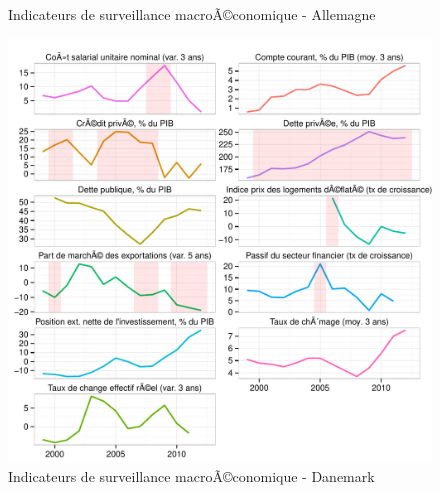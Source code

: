 \documentclass{article}\usepackage[]{graphicx}\usepackage[]{color}
\makeatletter
\def\maxwidth{ %
  \ifdim\Gin@nat@width>\linewidth
    \linewidth
  \else
    \Gin@nat@width
  \fi
}
\newenvironment{knitrout}{}{} %
\makeatother
\begin{document}
\begin{knitrout}
\begin{figure}[p]
{}

\caption[Indicateurs de surveillance macroÃ©conomique - Allemagne]{Indicateurs de surveillance macroÃ©conomique - Allemagne\label{fig:byco6}}
\end{figure}

\begin{figure}[p]


{\centering \includegraphics[width=\maxwidth]{figure_graph/byco7} 

}

\caption[Indicateurs de surveillance macroÃ©conomique - Danemark]{Indicateurs de surveillance macroÃ©conomique - Danemark\label{fig:byco7}}
\end{figure}

\begin{figure}[p]



\end{figure}
\end{knitrout}
\end{document}
